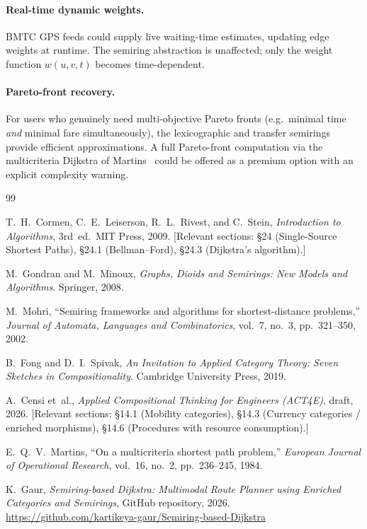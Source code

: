 \documentclass[12pt,a4paper]{article}
\begin{document}
\paragraph{Real-time dynamic weights.}
BMTC GPS feeds could supply live waiting-time estimates, updating edge
weights at runtime.  The semiring abstraction is unaffected; only the
weight function $w(u,v,t)$ becomes time-dependent.

\paragraph{Pareto-front recovery.}
For users who genuinely need multi-objective Pareto fronts (e.g.\ minimal
time \emph{and} minimal fare simultaneously), the lexicographic and
transfer semirings provide efficient approximations.  A full Pareto-front
computation via the multicriteria Dijkstra of Martins~\cite{martins1984}
could be offered as a premium option with an explicit complexity warning.

\begin{thebibliography}{99}

  T.\ H.\ Cormen, C.\ E.\ Leiserson, R.\ L.\ Rivest, and C.\ Stein,
  \emph{Introduction to Algorithms}, 3rd~ed.\
  MIT Press, 2009.
  [Relevant sections: §24 (Single-Source Shortest Paths), §24.1
  (Bellman--Ford), §24.3 (Dijkstra's algorithm).]

  M.\ Gondran and M.\ Minoux,
  \emph{Graphs, Dioids and Semirings: New Models and Algorithms}.
  Springer, 2008.

  M.\ Mohri,
  ``Semiring frameworks and algorithms for shortest-distance problems,''
  \emph{Journal of Automata, Languages and Combinatorics},
  vol.~7, no.~3, pp.~321--350, 2002.

  B.\ Fong and D.~I.\ Spivak,
  \emph{An Invitation to Applied Category Theory: Seven Sketches in
  Compositionality}.
  Cambridge University Press, 2019.

  A.\ Censi et~al.,
  \emph{Applied Compositional Thinking for Engineers (ACT4E)},
  draft, 2026.
  [Relevant sections: §14.1 (Mobility categories), §14.3 (Currency
  categories / enriched morphisms), §14.6 (Procedures with resource
  consumption).]

  E.~Q.\ V.\ Martins,
  ``On a multicriteria shortest path problem,''
  \emph{European Journal of Operational Research},
  vol.~16, no.~2, pp.~236--245, 1984.

  K.\ Gaur,
  \emph{Semiring-based Dijkstra: Multimodal Route Planner using
  Enriched Categories and Semirings},
  GitHub repository, 2026.
  \url{https://github.com/kartikeya-gaur/Semiring-based-Dijkstra}

\end{thebibliography}
\appendix
\end{document}
